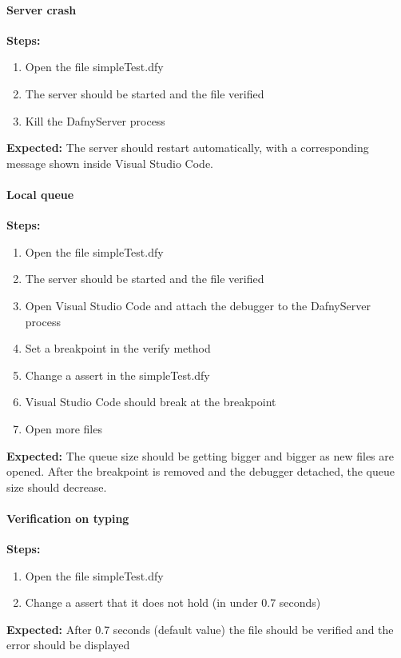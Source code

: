 \paragraph{Server crash}
\textbf{\newline Steps:}
\begin{enumerate}
	\item Open the file simpleTest.dfy
	\item The server should be started and the file verified
	\item Kill the DafnyServer process
\end{enumerate}
\textbf{\newline Expected:}
The server should restart automatically, with a corresponding message shown inside Visual Studio Code. 

\paragraph{Local queue}
\textbf{\newline Steps:}
\begin{enumerate}
	\item Open the file simpleTest.dfy
	\item The server should be started and the file verified
	\item Open Visual Studio Code and attach the debugger to the DafnyServer process
	\item Set a breakpoint in the verify method
	\item Change a assert in the simpleTest.dfy 
	\item Visual Studio Code should break at the breakpoint
	\item Open more files
\end{enumerate}
\textbf{\newline Expected:}
The queue size should be getting bigger and bigger as new files are opened. After the breakpoint is removed and the debugger detached, the queue size should decrease. 

\paragraph{Verification on typing}
\textbf{\newline Steps:}
\begin{enumerate}
	\item Open the file simpleTest.dfy
	\item Change a assert that it does not hold (in under 0.7 seconds)
\end{enumerate}
\textbf{\newline Expected:}
After 0.7 seconds (default value) the file should be verified and the error should be displayed 


